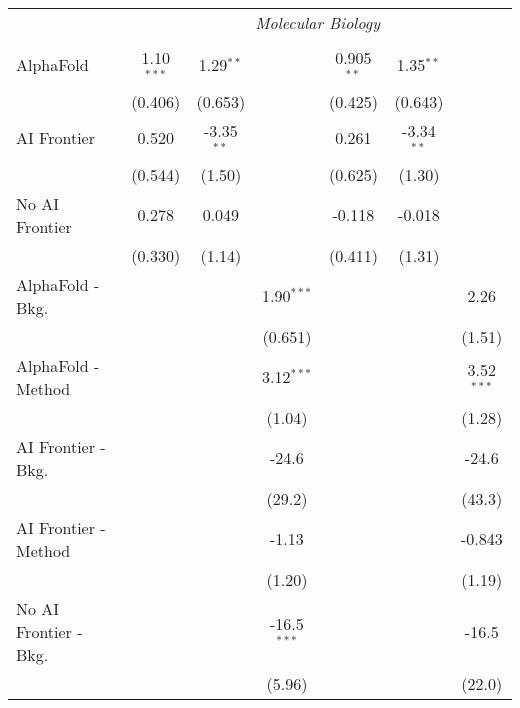 \begin{tabular}{lcccccc}
 & \multicolumn{6}{c}{\textit{Molecular Biology}} \\ \\
   AlphaFold               & 1.10$^{***}$ & 1.29$^{**}$  &               & 0.905$^{**}$ & 1.35$^{**}$  &   \\   
                           & (0.406)      & (0.653)      &               & (0.425)      & (0.643)      &   \\   
   AI Frontier             & 0.520        & -3.35$^{**}$ &               & 0.261        & -3.34$^{**}$ &   \\   
                           & (0.544)      & (1.50)       &               & (0.625)      & (1.30)       &   \\   
   No AI Frontier          & 0.278        & 0.049        &               & -0.118       & -0.018       &   \\   
                           & (0.330)      & (1.14)       &               & (0.411)      & (1.31)       &   \\   
   AlphaFold - Bkg.        &              &              & 1.90$^{***}$  &              &              & 2.26\\   
                           &              &              & (0.651)       &              &              & (1.51)\\   
   AlphaFold - Method      &              &              & 3.12$^{***}$  &              &              & 3.52$^{***}$\\   
                           &              &              & (1.04)        &              &              & (1.28)\\   
   AI Frontier - Bkg.      &              &              & -24.6         &              &              & -24.6\\   
                           &              &              & (29.2)        &              &              & (43.3)\\   
   AI Frontier - Method    &              &              & -1.13         &              &              & -0.843\\   
                           &              &              & (1.20)        &              &              & (1.19)\\   
   No AI Frontier - Bkg.   &              &              & -16.5$^{***}$ &              &              & -16.5\\   
                           &              &              & (5.96)        &              &              & (22.0)\\   

\end{tabular}

